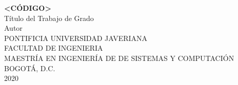 \thispagestyle{empty}

\begin{center}
		\vspace*{2cm}
		\fontsize{16pt}{16pt}\textbf{<CÓDIGO>}\\
		\fontsize{14pt}{14pt}\selectfont Título del Trabajo de Grado\\ %
		\vspace*{5cm}
		\fontsize{14pt}{14pt}\selectfont Autor\\ %
		\vspace*{5cm}
		\fontsize{14pt}{14pt}\selectfont PONTIFICIA UNIVERSIDAD JAVERIANA\\
		FACULTAD DE INGENIERIA\\
		MAESTRÍA EN INGENIERÍA DE DE SISTEMAS Y COMPUTACIÓN\\
		BOGOTÁ, D.C.\\
		2020 %

\end{center}



